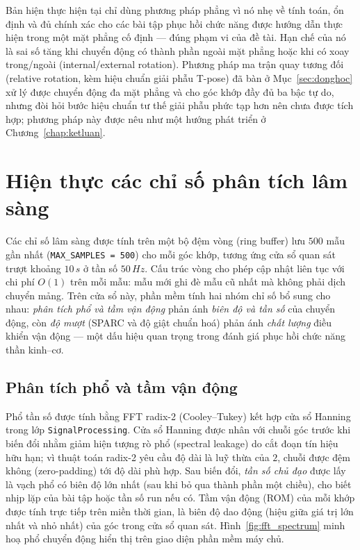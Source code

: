 \documentclass[../DoAn.tex]{subfiles}
\begin{document}
Bản hiện thực hiện tại chỉ dùng phương pháp phẳng vì nó nhẹ về tính toán, ổn định và đủ chính xác cho các bài tập phục hồi chức năng được hướng dẫn thực hiện trong một mặt phẳng cố định --- đúng phạm vi của đề tài. Hạn chế của nó là sai số tăng khi chuyển động có thành phần ngoài mặt phẳng hoặc khi có xoay trong/ngoài (internal/external rotation). Phương pháp ma trận quay tương đối (relative rotation, kèm hiệu chuẩn giải phẫu T-pose) đã bàn ở Mục~\ref{sec:donghoc} xử lý được chuyển động đa mặt phẳng và cho góc khớp đầy đủ ba bậc tự do, nhưng đòi hỏi bước hiệu chuẩn tư thế giải phẫu phức tạp hơn nên chưa được tích hợp; phương pháp này được nêu như một hướng phát triển ở Chương~\ref{chap:ketluan}.


\section{Hiện thực các chỉ số phân tích lâm sàng}
\label{sec:impl_clinical}

Các chỉ số lâm sàng được tính trên một bộ đệm vòng (ring buffer) lưu $500$ mẫu gần nhất (\texttt{MAX\_SAMPLES = 500}) cho mỗi góc khớp, tương ứng cửa sổ quan sát trượt khoảng $10\,\si{s}$ ở tần số $50\,\si{Hz}$. Cấu trúc vòng cho phép cập nhật liên tục với chi phí $O(1)$ trên mỗi mẫu: mẫu mới ghi đè mẫu cũ nhất mà không phải dịch chuyển mảng. Trên cửa sổ này, phần mềm tính hai nhóm chỉ số bổ sung cho nhau: \emph{phân tích phổ và tầm vận động} phản ánh \emph{biên độ và tần số} của chuyển động, còn \emph{độ mượt} (SPARC và độ giật chuẩn hoá) phản ánh \emph{chất lượng} điều khiển vận động --- một dấu hiệu quan trọng trong đánh giá phục hồi chức năng thần kinh--cơ.

\subsection{Phân tích phổ và tầm vận động}
Phổ tần số được tính bằng FFT radix-2 (Cooley--Tukey) kết hợp cửa sổ Hanning trong lớp \texttt{SignalProcessing}. Cửa sổ Hanning được nhân với chuỗi góc trước khi biến đổi nhằm giảm hiện tượng rò phổ (spectral leakage) do cắt đoạn tín hiệu hữu hạn; vì thuật toán radix-2 yêu cầu độ dài là luỹ thừa của $2$, chuỗi được đệm không (zero-padding) tới độ dài phù hợp. Sau biến đổi, \emph{tần số chủ đạo} được lấy là vạch phổ có biên độ lớn nhất (sau khi bỏ qua thành phần một chiều), cho biết nhịp lặp của bài tập hoặc tần số run nếu có. Tầm vận động (ROM) của mỗi khớp được tính trực tiếp trên miền thời gian, là biên độ dao động (hiệu giữa giá trị lớn nhất và nhỏ nhất) của góc trong cửa sổ quan sát. Hình~\ref{fig:fft_spectrum} minh hoạ phổ chuyển động hiển thị trên giao diện phần mềm máy chủ.
\end{document}
